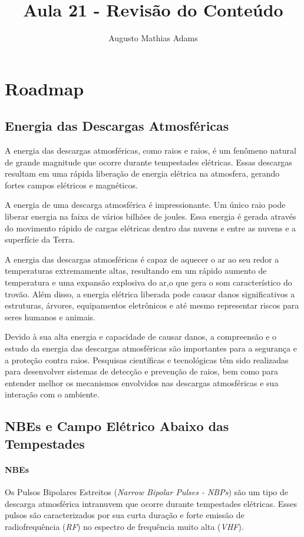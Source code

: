 \documentclass[a4paper, 12pt, onecolumn,singlespacing]{article}
\title{Aula 21 - Revisão do Conteúdo}
\author[1]{Augusto Mathias Adams}
\affil[1]{augusto.adams@ufpr.br}
\begin{document}
	
	\maketitle
	
	\section{Roadmap}
	
	\subsection{Energia das Descargas Atmosféricas}
	
	A energia das descargas atmosféricas, como raios e raios, é um fenômeno natural	de grande magnitude que ocorre durante tempestades elétricas. Essas descargas resultam em uma	rápida liberação de energia elétrica na atmosfera, gerando fortes campos elétricos e magnéticos.
	
	A energia de uma descarga atmosférica é impressionante. Um único raio pode liberar energia
	na faixa de vários bilhões de joules. Essa energia é gerada através do movimento rápido de cargas elétricas dentro das nuvens e entre as nuvens e a superfície da Terra.
	
	A energia das descargas atmosféricas é capaz de aquecer o ar ao seu redor a temperaturas extremamente altas, resultando em um rápido aumento de temperatura e uma expansão explosiva do ar,o que gera o som característico do trovão. Além disso, a energia elétrica liberada pode causar danos significativos a estruturas, árvores, equipamentos eletrônicos e até mesmo representar riscos para	seres humanos e animais.
	
	Devido à sua alta energia e capacidade de causar danos, a compreensão e o estudo da energia	das descargas atmosféricas são importantes para a segurança e a proteção contra raios. Pesquisas científicas e tecnológicas têm sido realizadas para desenvolver sistemas de detecção e prevenção de	raios, bem como para entender melhor os mecanismos envolvidos nas descargas atmosféricas e sua interação com o ambiente.
	
	\subsection{NBEs e Campo Elétrico Abaixo das Tempestades}
	
	\paragraph{NBEs} Os Pulsos Bipolares Estreitos (\textit{Narrow Bipolar Pulses - NBPs}) são um tipo de descarga atmosférica intranuvem que ocorre durante tempestades elétricas. Esses pulsos são caracterizados por sua curta duração e forte emissão de radiofrequência (\textit{RF}) no espectro de frequência muito alta (\textit{VHF}).
	
\end{document}
